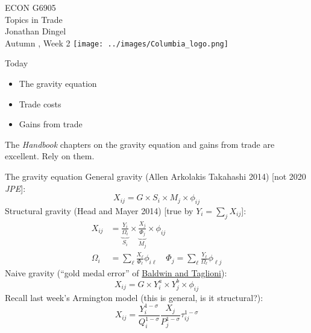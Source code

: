 \documentclass[10pt,notes=hide,aspectratio=169]{beamer}
\begin{document}
\begin{frame}[plain]
\begin{center}
\large
\textcolor{columbiadarkblue}{ECON G6905\\
Topics in Trade\\ 
Jonathan Dingel\\
Autumn \the\year, Week 2}
\vfill 
\texttt{[image: ../images/Columbia\_logo.png]}
\end{center}
\end{frame}
\begin{frame}{Today}
\begin{itemize}
	\item The gravity equation
	\item Trade costs
	\item Gains from trade
\end{itemize}
The \textit{Handbook} chapters on the gravity equation and gains from trade are excellent.
Rely on them.
\end{frame}
\begin{frame}{The gravity equation}
General gravity (Allen Arkolakis Takahashi 2014) [not 2020 \textit{JPE}]:
\begin{equation*}
X_{ij} = G \times S_i \times M_j \times \phi_{ij}
\end{equation*}
Structural gravity (Head and Mayer 2014) [true by $Y_i = \sum_j X_{ij}$]:
\begin{align*}
X_{ij} &= \underbrace{\frac{Y_i}{\Omega_i}}_{S_i} \times \underbrace{\frac{X_j}{\Phi_j}}_{M_j} \times \phi_{ij}\\
\Omega_i &= \sum_{\ell} \frac{X_{\ell}}{\Phi_{\ell}} \phi_{i \ell}
\quad 
\Phi_j  = \sum_{\ell} \frac{Y_{\ell}}{\Omega_{\ell}} \phi_{\ell j}
\end{align*}
Naive gravity (``gold medal error'' of \href{https://www.nber.org/papers/w12516}{Baldwin and Taglioni}):
\begin{equation*}
X_{ij} = G \times Y_i^a \times Y_j^b \times \phi_{ij}
\end{equation*}
Recall last week's Armington model (this is general, is it structural?):
\begin{equation*}
X_{ij}	= \frac{Y_i^{1-\sigma}}{Q_i^{1-\sigma}} \frac{X_j}{P_j^{1-\sigma}}\tau_{ij}^{1-\sigma}
\end{equation*}
\end{frame}
\end{document}
